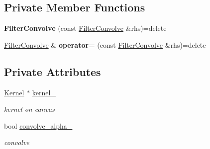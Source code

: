 \subsection*{Private Member Functions}
\begin{DoxyCompactItemize}
\item 
{\bfseries Filter\+Convolve} (const \hyperlink{classimage__tools_1_1FilterConvolve}{Filter\+Convolve} \&rhs)=delete\hypertarget{classimage__tools_1_1FilterConvolve_a3f8e1427849667ee8fdc762e702ef51f}{}\label{classimage__tools_1_1FilterConvolve_a3f8e1427849667ee8fdc762e702ef51f}

\item 
\hyperlink{classimage__tools_1_1FilterConvolve}{Filter\+Convolve} \& {\bfseries operator=} (const \hyperlink{classimage__tools_1_1FilterConvolve}{Filter\+Convolve} \&rhs)=delete\hypertarget{classimage__tools_1_1FilterConvolve_a1162e6ba278b5d34ab10cf606824bdfc}{}\label{classimage__tools_1_1FilterConvolve_a1162e6ba278b5d34ab10cf606824bdfc}

\end{DoxyCompactItemize}
\subsection*{Private Attributes}
\begin{DoxyCompactItemize}
\item 
\hyperlink{classimage__tools_1_1Kernel}{Kernel} $\ast$ \hyperlink{classimage__tools_1_1FilterConvolve_accd0997ec304cd1f73e9c831ce4ca43d}{kernel\+\_\+}\hypertarget{classimage__tools_1_1FilterConvolve_accd0997ec304cd1f73e9c831ce4ca43d}{}\label{classimage__tools_1_1FilterConvolve_accd0997ec304cd1f73e9c831ce4ca43d}

\begin{DoxyCompactList}\small\item\em kernel on canvas \end{DoxyCompactList}\item 
bool \hyperlink{classimage__tools_1_1FilterConvolve_a280a5b6811bba56755972f9a67315b4b}{convolve\+\_\+alpha\+\_\+}\hypertarget{classimage__tools_1_1FilterConvolve_a280a5b6811bba56755972f9a67315b4b}{}\label{classimage__tools_1_1FilterConvolve_a280a5b6811bba56755972f9a67315b4b}

\begin{DoxyCompactList}\small\item\em convolve \end{DoxyCompactList}\end{DoxyCompactItemize}


